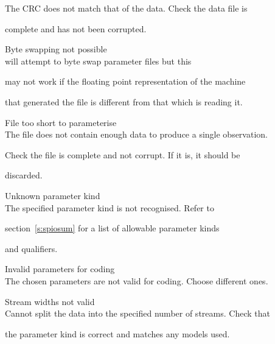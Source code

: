 \begin{itemize}
\begin{itemize}
        The CRC does not match that of the data.  Check the data file is 


        complete and has not been corrupted.





    Byte swapping not possible\\


         will attempt to byte swap parameter files but this 


        may not work if the floating point representation of the machine 


        that generated the file is different from that which is reading it.





    File too short to parameterise\\


        The file does not contain enough data to produce a single observation.


        Check the file is complete and not corrupt.  If it is, it should be 


        discarded.





    Unknown parameter kind\\


        The specified parameter kind is not recognised.  Refer to 


        section~\ref{s:spiosum} for a list of allowable parameter kinds


        and qualifiers.





    Invalid parameters for coding\\


        The chosen parameters are not valid for coding.  Choose different ones.





    Stream widths not valid\\


        Cannot split the data into the specified number of streams.  Check that


        the parameter kind is correct and matches any models used.






\end{itemize}
\end{itemize}
